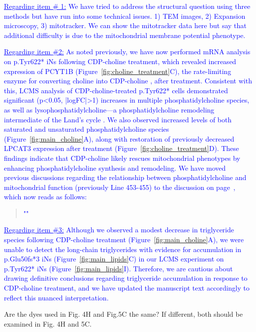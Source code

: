 \textcolor{blue}{\underline{Regarding item \# 1:} We have tried to address the structural question using three methods but have run into some technical issues. 1) TEM images, 2) Expansion microscopy, 3) mitotracker. We can show the mitotracker data here but say that additional difficulty is due to the mitochondrial membrane potential phenotype.}

\textcolor{blue}{\underline{Regarding item \#2:} As noted previously, we have now performed mRNA analysis on p.Tyr622* iNs following CDP-choline treatment, which revealed increased expression of PCYT1B (Figure~\ref{fig:choline_treatment}C), the rate-limiting enzyme for converting choline into CDP-choline \cite{Lykidis1998-rj}, after treatment. Consistent with this, LCMS analysis of CDP-choline-treated p.Tyr622* cells demonstrated significant (p<0.05, |logFC|>1) increases in multiple phosphatidylcholine species, as well as lysophosphatidylcholine—a phosphatidylcholine remodeling intermediate of the Land's cycle \cite{Wang2019-om}. We also observed increased levels of both saturated and unsaturated phosphatidylcholine species (Figure~\ref{fig:main_choline}A), along with restoration of previously decreased LPCAT3 expression after treatment (Figure~\ref{fig:choline_treatment}D). These findings indicate that CDP-choline likely rescues mitochondrial phenotypes by enhancing phosphatidylcholine synthesis and remodeling. We have moved previous discussions regarding the relationship between phosphatidylcholine and mitochondrial function (previously Line 453-455) to the discussion on page~\pageref{quoteI-label}, which now reads as follows:}

\begin{quote}
	\textcolor{blue}{"\quoteI"}
\end{quote}

\textcolor{blue}{\underline{Regarding item \#3:} Although we observed a modest decrease in triglyceride species following CDP-choline treatment (Figure~\ref{fig:main_choline}A), we were unable to detect the long-chain triglycerides with evidence for accumulation in p.Glu50fs*3 iNs (Figure~\ref{fig:main_lipids}C) in our LCMS experiment on p.Tyr622* iNs (Figure~\ref{fig:main_lipids}I). Therefore, we are cautious about drawing definitive conclusions regarding triglyceride accumulation in response to CDP-choline treatment, and we have updated the manuscript text accordingly to reflect this nuanced interpretation.}

Are the dyes used in Fig. 4H and Fig.5C the same? If different, both should be examined in Fig. 4H and 5C.

